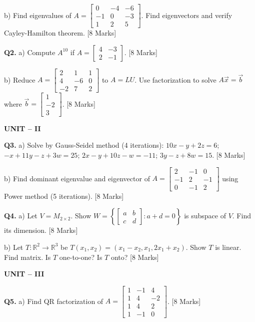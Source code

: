\documentclass[11pt,a4paper]{article}
\begin{document}
b) Find eigenvalues of $A = \begin{bmatrix} 0 & -4 & -6 \\ -1 & 0 & -3 \\ 1 & 2 & 5 \end{bmatrix}$. Find eigenvectors and verify Cayley-Hamilton theorem. \hfill [8 Marks]

\textbf{Q2.} a) Compute $A^{10}$ if $A = \begin{bmatrix} 4 & -3 \\ 2 & -1 \end{bmatrix}$. \hfill [8 Marks]

b) Reduce $A = \begin{bmatrix} 2 & 1 & 1 \\ 4 & -6 & 0 \\ -2 & 7 & 2 \end{bmatrix}$ to $A = LU$. Use factorization to solve $A\vec{x} = \vec{b}$ where $\vec{b} = \begin{bmatrix} 1 \\ -2 \\ 3 \end{bmatrix}$. \hfill [8 Marks]

\textbf{UNIT -- II}

\textbf{Q3.} a) Solve by Gauss-Seidel method (4 iterations): $10x - y + 2z = 6$; $-x + 11y - z + 3w = 25$; $2x - y + 10z - w = -11$; $3y - z + 8w = 15$. \hfill [8 Marks]

b) Find dominant eigenvalue and eigenvector of $A = \begin{bmatrix} 2 & -1 & 0 \\ -1 & 2 & -1 \\ 0 & -1 & 2 \end{bmatrix}$ using Power method (5 iterations). \hfill [8 Marks]

\textbf{Q4.} a) Let $V = M_{2 \times 2}$. Show $W = \left\{ \begin{bmatrix} a & b \\ c & d \end{bmatrix} : a + d = 0 \right\}$ is subspace of $V$. Find its dimension. \hfill [8 Marks]

b) Let $T: \mathbb{R}^2 \to \mathbb{R}^3$ be $T(x_1, x_2) = (x_1 - x_2, x_1, 2x_1 + x_2)$. Show $T$ is linear. Find matrix. Is $T$ one-to-one? Is $T$ onto? \hfill [8 Marks]

\textbf{UNIT -- III}

\textbf{Q5.} a) Find QR factorization of $A = \begin{bmatrix} 1 & -1 & 4 \\ 1 & 4 & -2 \\ 1 & 4 & 2 \\ 1 & -1 & 0 \end{bmatrix}$. \hfill [8 Marks]
\end{document}
